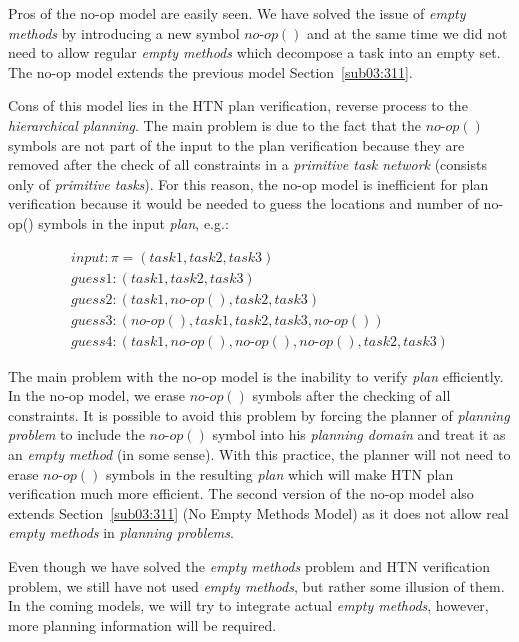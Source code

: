 \medskip\noindent
Pros of the no-op model are easily seen. We have solved the issue of \emph{empty methods} by introducing a new symbol $no\text{-}op()$ and at the same time we did not need to allow regular \emph{empty methods} which decompose a task into an empty set. The no-op model extends the previous model Section~\ref{sub03:311}.

\medskip\noindent
Cons of this model lies in the HTN plan verification, reverse process to the \emph{hierarchical planning}. The main problem is due to the fact that the $no\text{-}op()$ symbols are not part of the input to the plan verification because they are removed after the check of all constraints in a \emph{primitive task network} (consists only of \emph{primitive tasks}). For this reason, the no-op model is inefficient for plan verification because it would be needed to guess the locations and number of no-op() symbols in the input \emph{plan}, e.g.:

\begin{gather*}
    input: \pi = (task1, task2, task3) \\
    guess 1: (task1, task2, task3) \\
    guess 2: (task1, no\text{-}op(), task2, task3) \\
    guess 3: (no\text{-}op(), task1, task2, task3, no\text{-}op()) \\
    guess 4: (task1, no\text{-}op(), no\text{-}op(), no\text{-}op(), task2, task3)
\end{gather*}

\medskip\noindent
The main problem with the no-op model is the inability to verify \emph{plan} efficiently. In the no-op model, we erase $no\text{-}op()$ symbols after the checking of all constraints. It is possible to avoid this problem by forcing the planner of \emph{planning problem} to include the $no\text{-}op()$ symbol into his \emph{planning domain} and treat it as an \emph{empty method} (in some sense). With this practice, the planner will not need to erase $no\text{-}op()$ symbols in the resulting \emph{plan} which will make HTN plan verification much more efficient. The second version of the no-op model also extends Section~\ref{sub03:311} (No Empty Methods Model) as it does not allow real \emph{empty methods} in \emph{planning problems}.

\medskip\noindent
Even though we have solved the \emph{empty methods} problem and HTN verification problem, we still have not used \emph{empty methods}, but rather some illusion of them. In the coming models, we will try to integrate actual \emph{empty methods}, however, more planning information will be required.

